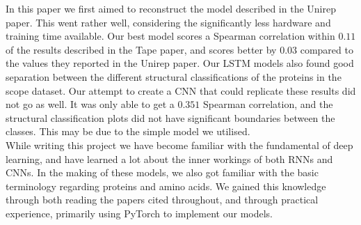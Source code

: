 In this paper we first aimed to reconstruct the model described in the Unirep paper\cite{unirep}. This went rather well, considering the significantly less hardware and training time available. Our best model scores a Spearman correlation within $0.11$ of the results described in the Tape paper\cite{tape}, and scores better by $0.03$ compared to the values they reported in the Unirep paper. Our LSTM models also found good separation between the different structural classifications of the proteins in the scope dataset.\cite{scope} Our attempt to create a CNN that could replicate these results did not go as well. It was only able to get a $0.351$ Spearman correlation, and the structural classification plots did not have significant boundaries between the classes. This may be due to the simple model we utilised.\\

\noindent
While writing this project we have become familiar with the fundamental of deep learning, and have learned a lot about the inner workings of both RNNs and CNNs. In the making of these models, we also got familiar with the basic terminology regarding proteins and amino acids. We gained this knowledge through both reading the papers cited throughout, and through practical experience, primarily using PyTorch to implement our models.